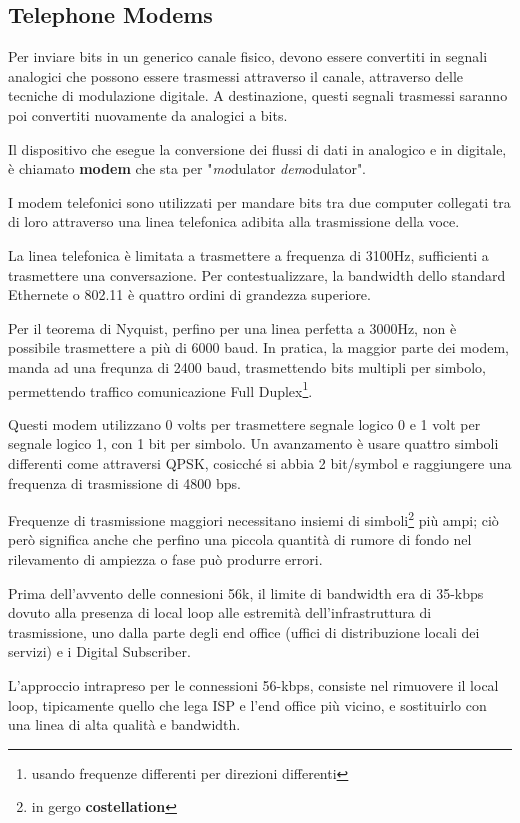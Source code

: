 \documentclass[../ComputerNetworks.tex]{subfiles}
\begin{document}
\subsection{Telephone Modems}

Per inviare bits in un generico canale fisico, devono essere convertiti in segnali analogici che possono essere trasmessi attraverso il canale, attraverso delle tecniche di modulazione digitale.
A destinazione, questi segnali trasmessi saranno poi convertiti nuovamente da analogici a bits.

Il dispositivo che esegue la conversione dei flussi di dati in analogico e in digitale, è chiamato \textbf{modem} che sta per "\emph{mo}dulator \emph{dem}odulator".

I modem telefonici sono utilizzati per mandare bits tra due computer collegati tra di loro attraverso una linea telefonica adibita alla trasmissione della voce.

La linea telefonica è limitata a trasmettere a frequenza di 3100Hz, sufficienti a trasmettere una conversazione.
Per contestualizzare, la bandwidth dello standard Ethernete o 802.11 è quattro ordini di grandezza superiore.

Per il teorema di Nyquist, perfino per una linea perfetta a 3000Hz, non è possibile trasmettere a più di 6000 baud.
In pratica, la maggior parte dei modem, manda ad una frequnza di 2400 baud, trasmettendo bits multipli per simbolo, permettendo traffico comunicazione Full Duplex\footnote{usando frequenze differenti per direzioni differenti}.

Questi modem utilizzano 0 volts per trasmettere segnale logico 0 e 1 volt per segnale logico 1, con 1 bit per simbolo.
Un avanzamento è usare quattro simboli differenti come attraversi QPSK, cosicché si abbia 2 bit/symbol e raggiungere una frequenza di trasmissione di 4800 bps.

Frequenze di trasmissione maggiori necessitano insiemi di simboli\footnote{in gergo \textbf{costellation}} più ampi; ciò però significa anche che perfino una piccola quantità di rumore di fondo nel rilevamento di ampiezza o fase può produrre errori.

Prima dell'avvento delle connesioni 56k, il limite di bandwidth era di 35-kbps dovuto alla presenza di local loop alle estremità dell'infrastruttura di trasmissione, uno dalla parte degli end office (uffici di distribuzione locali dei servizi) e i Digital Subscriber.

L'approccio intrapreso per le connessioni 56-kbps, consiste nel rimuovere il local loop, tipicamente quello che lega ISP e l'end office più vicino, e sostituirlo con una linea di alta qualità e bandwidth.
\end{document}
